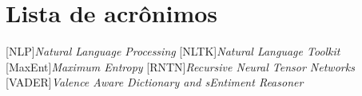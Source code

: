 \documentclass{iiufrgs}
\begin{document}
\tableofcontents

\chapter*{Lista de acrônimos}

\vspace{20px}
\begin{acronym}[XXXXXXXXXX]
[NLP]{\textit{Natural Language Processing}}
[NLTK]{\textit{Natural Language Toolkit}}
[MaxEnt]{\textit{Maximum Entropy}}
[RNTN]{\textit{Recursive Neural Tensor Networks}}
[VADER]{\textit{Valence Aware Dictionary and sEntiment Reasoner}}
\end{acronym}
\listoffigures
\listoftables


\begin{abstract}


\end{abstract}


\acresetall





% 
% 
% 
% 



\end{document}
